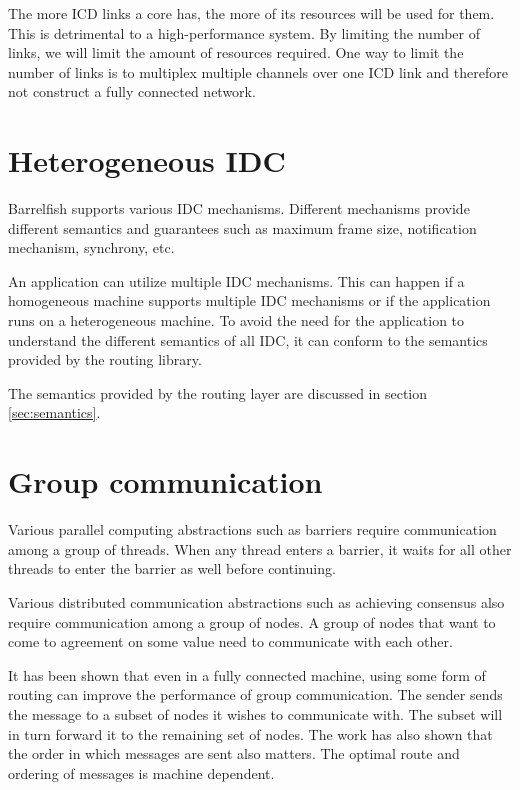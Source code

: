 \documentclass[a4paper,twoside]{report} %
\begin{document}
The more ICD links a core has, the more of its resources will be used for them. This is detrimental to a high-performance system. By limiting the number of links, we will limit the amount of resources required. One way to limit the number of links is to multiplex multiple channels over one ICD link and therefore not construct a fully connected network. 


\section{Heterogeneous IDC}
Barrelfish supports various IDC mechanisms.
Different mechanisms provide different semantics and guarantees such
as maximum frame size, notification mechanism, synchrony, etc.

An application can utilize multiple IDC mechanisms.  This can happen
if a homogeneous machine supports multiple IDC mechanisms or if the
application runs on a heterogeneous machine.  To avoid the need for
the application to understand the different semantics of all IDC, it
can conform to the semantics provided by the routing library.

The semantics provided by the routing layer are discussed in section
\ref{sec:semantics}.

\section{Group communication}

Various parallel computing abstractions such as barriers
require communication among a group of threads.
When any thread enters a barrier, it waits for all other threads to enter
the barrier as well before continuing.

Various distributed communication abstractions such as achieving consensus
also require communication among a group of nodes.
A group of nodes that want to come to agreement on some value
need to communicate with each other.

It has been shown \cite{nishtala:optimizing-collective:hotpar09,
  barrelfish:sosp09} that even in a fully connected 
machine, using some form of routing can improve the performance of group communication.
The sender sends the message to a subset of nodes it wishes to communicate with.
The subset will in turn forward it to the remaining set of nodes.
The work has also shown that the order in which messages are sent also matters.
The optimal route and ordering of messages is machine dependent.
\end{document}
